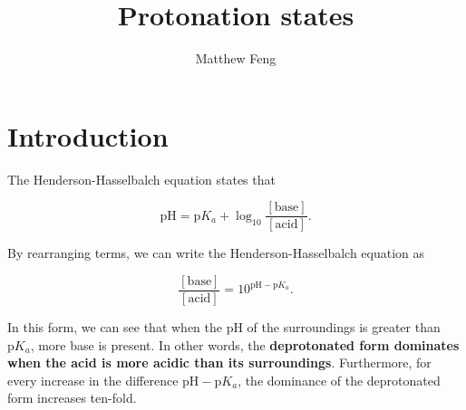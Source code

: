 \documentclass{article}
\title{Protonation states}
\author{Matthew Feng}
\newcommand{\pH}{\text{pH}}
\newcommand{\pKa}{\text{p}{K_a}}
\newcommand{\conc}[1]{\left[#1\right]}
\begin{document}
\maketitle

\section{Introduction}

The Henderson-Hasselbalch equation states that

$$
\pH = \pKa + \log_{10} \frac{\conc{\text{base}}}{\conc{\text{acid}}}.
$$

By rearranging terms, we can write the Henderson-Hasselbalch equation as

$$
\frac{\conc{\text{base}}}{\conc{\text{acid}}} = 10^{\pH - \pKa}.
$$

In this form, we can see that when the $\pH$ of the surroundings is greater than $\pKa$, more base is present. In other words, the {\bf deprotonated form dominates when the acid is more acidic than its surroundings}. Furthermore, for every increase in the difference $\pH - \pKa$, the dominance of the deprotonated form increases ten-fold.
\end{document}
